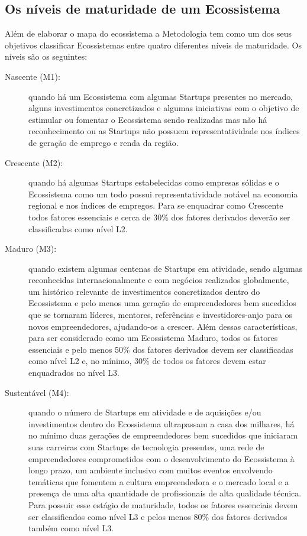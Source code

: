 \subsection{Os níveis de maturidade de um Ecossistema}
\label{subsection:niveis_de_maturidade_de_um_ecossistema}

Além de elaborar o mapa do ecossistema a Metodologia tem como um dos seus objetivos classificar Ecossistemas entre quatro diferentes níveis de maturidade. Os níveis são os seguintes:

\begin{description}
  \item [Nascente (M1):] quando há um Ecossistema com algumas Startups presentes no mercado, alguns investimentos concretizados e algumas iniciativas com o objetivo de estimular ou fomentar o Ecossistema sendo realizadas mas não há reconhecimento ou as Startups não possuem representatividade nos índices de geração de emprego e renda da região.

  \item [Crescente (M2):] quando há algumas Startups estabelecidas como empresas sólidas e o Ecossistema como um todo possui representatividade notável na economia regional e nos índices de empregos. Para se enquadrar como Crescente todos fatores essenciais e cerca de 30\% dos fatores derivados deverão ser classificadas como nível L2.

  \item [Maduro (M3):] quando existem algumas centenas de Startups em atividade, sendo algumas reconhecidas internacionalmente e com negócios realizados globalmente, um histórico relevante de investimentos concretizados dentro do Ecossistema e pelo menos uma geração de empreendedores bem sucedidos que se tornaram líderes, mentores, referências e investidores-anjo para os novos empreendedores, ajudando-os a crescer. Além dessas características, para ser considerado como um Ecossistema Maduro, todos os fatores essenciais e pelo menos 50\% dos fatores derivados devem ser classificadas como nível L2 e, no mínimo, 30\% de todos os fatores devem estar enquadrados no nível L3.

  \item [Sustentável (M4):] quando o número de Startups em atividade e de aquisições e/ou investimentos dentro do Ecossistema ultrapassam a casa dos milhares, há no mínimo duas gerações de empreendedores bem sucedidos que iniciaram suas carreiras com Startups de tecnologia presentes, uma rede de empreendedores comprometidos com o desenvolvimento do Ecossistema à longo prazo, um ambiente inclusivo com muitos eventos envolvendo temáticas que fomentem a cultura empreendedora e o mercado local e a presença de uma alta quantidade de profissionais de alta qualidade técnica. Para possuir esse estágio de maturidade, todos os fatores essenciais devem ser classificados como nível L3 e pelos menos 80\% dos fatores derivados também como nível L3.
\end{description}

